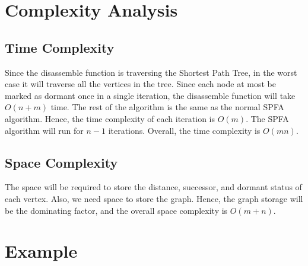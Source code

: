 \documentclass[a4paper,12pt]{article}
\begin{document}
\section*{Complexity Analysis}

\subsection*{Time Complexity}

Since the disassemble function is traversing the Shortest Path Tree, in the worst case it will traverse all the vertices in the tree.
Since each node at most be marked as dormant once in a single iteration, the disassemble function will take $O(n + m)$ time.
The rest of the algorithm is the same as the normal SPFA algorithm.
Hence, the time complexity of each iteration is $O(m)$.
The SPFA algorithm will run for $n - 1$ iterations.
Overall, the time complexity is $O(mn)$.

\subsection*{Space Complexity}

The space will be required to store the distance, successor, and dormant status of each vertex.
Also, we need space to store the graph.
Hence, the graph storage will be the dominating factor, and the overall space complexity is $O(m + n)$.

\section*{Example}

\begin{center}
\end{center}
\end{document}
